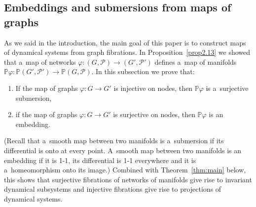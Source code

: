 \documentclass[10pt,a4paper]{amsart}
\numberwithin{equation}{section}
\begin{document}
\subsection{Embeddings and submersions from maps of graphs}

As we said in the introduction, the main goal of this paper is to construct maps of dynamical systems from graph
f\/ibrations.
In Proposition~\ref{prop2.13} we showed that a~map of networks $\varphi\colon (G,{\mathcal P})\to (G', {\mathcal P}')$
def\/ines a~map of manifolds $\mathbb{P} \varphi \colon \mathbb{P} (G', {\mathcal P}') \to \mathbb{P} (G,{\mathcal P})$.
In this subsection we prove that:
\begin{enumerate}\itemsep=0pt
\item[1)] If the map of graphs $\varphi\colon G\to G'$ is injective on nodes, then $\mathbb{P} \varphi$ is a~surjective
submersion,
\item[2)] if the map of graphs $\varphi\colon G\to G'$ is surjective on nodes, then $\mathbb{P} \varphi$ is an embedding.
\end{enumerate}
(Recall that a~smooth map between two manifolds is a~submersion if its dif\/ferential is onto at every point.
A~smooth map between two manifolds is an embedding if it is 1-1, its dif\/ferential is 1-1 everywhere and it is
a~homeomorphism onto its image.) Combined with Theorem~\ref{thm:main} below, this shows that surjective f\/ibrations of
networks of manifolds give rise to invariant dynamical subsystems and injective f\/ibrations give rise to projections of
dynamical systems.
\end{document}
